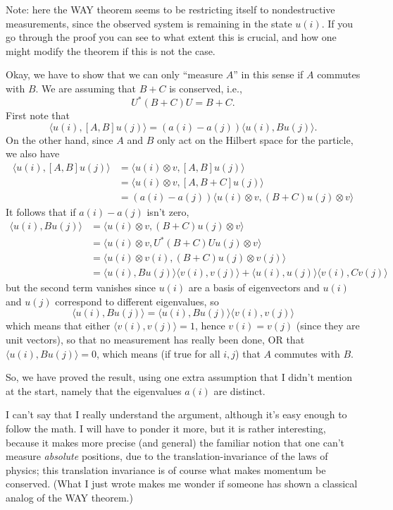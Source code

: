 \documentclass[12pt]{article}
\begin{document}
Note: here the WAY theorem seems to be restricting itself to
nondestructive measurements, since the observed system is remaining in
the state \(u(i)\). If you go through the proof you can see to what
extent this is crucial, and how one might modify the theorem if this is
not the case.

Okay, we have to show that we can only ``measure \(A\)'' in this sense
if \(A\) commutes with \(B\). We are assuming that \(B + C\) is
conserved, i.e., \[U^*(B + C)U = B + C.\] First note that
\[\langle u(i), [A,B] u(j)\rangle = (a(i)-a(j)) \langle u(i), Bu(j)\rangle.\]
On the other hand, since \(A\) and \(B\) only act on the Hilbert space
for the particle, we also have
\[\begin{aligned}\langle u(i),[A,B]u(j) \rangle &= \langle u(i)\otimes v,[A,B]u(j) \rangle \\ &= \langle u(i)\otimes v,[A,B+C]u(j) \rangle \\ &= (a(i)-a(j))\langle u(i)\otimes v,(B+C)u(j)\otimes v \rangle\end{aligned}\]
It follows that if \(a(i)-a(j)\) isn't zero,
\[\begin{aligned}\langle u(i),Bu(j) \rangle &= \langle u(i)\otimes v,(B+C)u(j)\otimes v \rangle \\ &= \langle u(i)\otimes v, U^*(B+C)Uu(j)\otimes v \rangle \\ &= \langle u(i)\otimes v(i),(B+C)u(j)\otimes v(j) \rangle \\ &= \langle u(i),Bu(j) \rangle\langle v(i),v(j) \rangle + \langle u(i),u(j) \rangle\langle v(i),Cv(j) \rangle\end{aligned}\]
but the second term vanishes since \(u(i)\) are a basis of eigenvectors
and \(u(i)\) and \(u(j)\) correspond to different eigenvalues, so
\[\langle u(i), Bu(j)\rangle = \langle u(i), Bu(j)\rangle \langle v(i), v(j)\rangle\]
which means that either \(\langle v(i), v(j)\rangle = 1\), hence
\(v(i) = v(j)\) (since they are unit vectors), so that no measurement
has really been done, OR that \(\langle u(i), B u(j)\rangle = 0\), which
means (if true for all \(i,j\)) that \(A\) commutes with \(B\).

So, we have proved the result, using one extra assumption that I didn't
mention at the start, namely that the eigenvalues \(a(i)\) are distinct.

I can't say that I really understand the argument, although it's easy
enough to follow the math. I will have to ponder it more, but it is
rather interesting, because it makes more precise (and general) the
familiar notion that one can't measure \emph{absolute} positions, due to
the translation-invariance of the laws of physics; this translation
invariance is of course what makes momentum be conserved. (What I just
wrote makes me wonder if someone has shown a classical analog of the WAY
theorem.)
\end{document}
